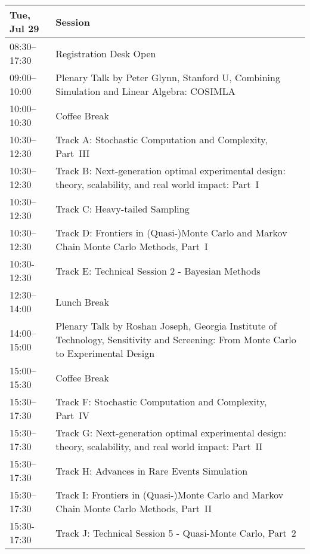 \begin{table}
\begin{tabularx}{\textwidth}{>{\hsize=0.32\hsize}X|>{\hsize=1.7\hsize}X}
\hline
\textbf{Tue, Jul 29} & \textbf{Session} \\
\hline
\cellcolor{\EmptyColor}08:30–17:30 & \cellcolor{\EmptyColor}Registration Desk Open \\
\cellcolor{\PlenaryColor}09:00–10:00 & \cellcolor{\PlenaryColor}Plenary Talk by Peter Glynn, Stanford U, Combining Simulation and Linear Algebra: COSIMLA \\
\cellcolor{\EmptyColor}10:00–10:30 & \cellcolor{\EmptyColor}Coffee Break \\
\cellcolor{\SessionTitleColor}10:30–12:30 & \cellcolor{\SessionTitleColor}Track A: Stochastic Computation and Complexity, Part~III \\
\cellcolor{\SessionTitleColor}10:30–12:30 & \cellcolor{\SessionTitleColor}Track B: Next-generation optimal experimental design: theory, scalability, and real world impact: Part~I \\
\cellcolor{\SessionTitleColor}10:30–12:30 & \cellcolor{\SessionTitleColor}Track C: Heavy-tailed Sampling \\
\cellcolor{\SessionTitleColor}10:30–12:30 & \cellcolor{\SessionTitleColor}Track D: Frontiers in (Quasi-)Monte Carlo and Markov Chain Monte Carlo Methods, Part~I \\
\cellcolor{\SessionLightColor}10:30-12:30 & \cellcolor{\SessionLightColor}Track E: Technical Session 2 - Bayesian Methods \\
\cellcolor{\EmptyColor}12:30–14:00 & \cellcolor{\EmptyColor}Lunch Break \\
\cellcolor{\PlenaryColor}14:00–15:00 & \cellcolor{\PlenaryColor}Plenary Talk by Roshan Joseph, Georgia Institute of Technology, Sensitivity and Screening: From Monte Carlo to Experimental Design \\
\cellcolor{\EmptyColor}15:00–15:30 & \cellcolor{\EmptyColor}Coffee Break \\
\cellcolor{\SessionTitleColor}15:30–17:30 & \cellcolor{\SessionTitleColor}Track F: Stochastic Computation and Complexity, Part~IV \\
\cellcolor{\SessionTitleColor}15:30–17:30 & \cellcolor{\SessionTitleColor}Track G: Next-generation optimal experimental design: theory, scalability, and real world impact: Part~II \\
\cellcolor{\SessionTitleColor}15:30–17:30 & \cellcolor{\SessionTitleColor}Track H: Advances in Rare Events Simulation \\
\cellcolor{\SessionTitleColor}15:30–17:30 & \cellcolor{\SessionTitleColor}Track I: Frontiers in (Quasi-)Monte Carlo and Markov Chain Monte Carlo Methods, Part~II \\
\cellcolor{\SessionLightColor}15:30-17:30 & \cellcolor{\SessionLightColor}Track J: Technical Session 5 - Quasi-Monte Carlo, Part~2 \\
\hline
\end{tabularx}
\end{table}

